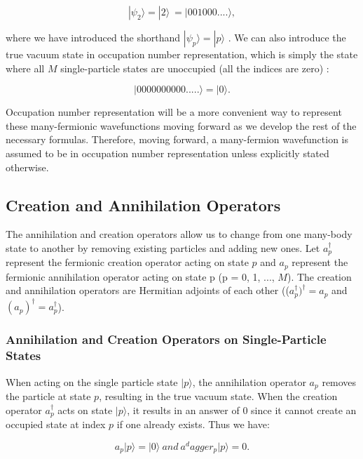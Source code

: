 \begin{equation}
	|\psi_2\rangle = |2\rangle \ = |001000....\rangle,
\end{equation}

where we have introduced the shorthand $|\psi_p\rangle = |p\rangle$ \cite{Ref5}.  We can also introduce the true vacuum state in occupation number representation, which is simply the state where all $M$ single-particle states are unoccupied (all the indices are zero) \cite{Ref5}:

\begin{equation}
	|0000000000.....\rangle = |0\rangle.
\end{equation}

Occupation number representation will be a more convenient way to represent these many-fermionic wavefunctions moving forward as we develop the rest of the necessary formulas. Therefore, moving forward, a many-fermion wavefunction is assumed to be in occupation number representation unless explicitly stated otherwise.

\subsection*{Creation and Annihilation Operators}

The annihilation and creation operators allow us to change from one many-body state to another by removing existing particles and adding new ones. Let $a^\dagger_p$ represent the fermionic creation operator acting on state $p$ and $a_p$ represent the fermionic annihilation operator acting on state p (p = 0, 1, ..., $M$). The creation and annihilation operators are Hermitian adjoints of each other (($a^\dagger_p)^\dagger = a_p$ and $(a_p)^\dagger = a^\dagger_p$).
	
	\subsubsection{Annihilation and Creation Operators on Single-Particle States}
	When acting on the single particle state $|p\rangle$, the annihilation operator $a_p$ removes the particle at state $p$, resulting in the true vacuum state. When the creation operator $a^\dagger_p$ acts on state $|p\rangle$, it results in an answer of 0 since it cannot create an occupied state at index $p$ if one already exists. Thus we have:

	\begin{equation}
		a_p|p\rangle = |0\rangle\ and\  a^dagger_p|p\rangle = 0.
	\end{equation}

